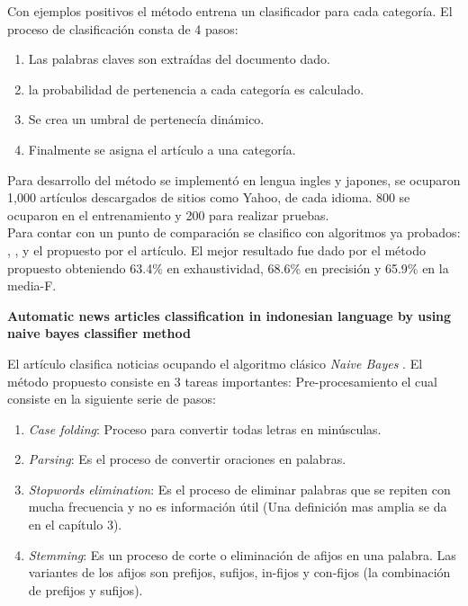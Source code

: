 Con ejemplos positivos el método entrena un clasificador para cada categoría.
El proceso de clasificación consta de 4 pasos:

\begin{enumerate}
	\item Las palabras claves son extraídas del documento dado.
	\item la probabilidad de pertenencia a cada categoría es calculado.
	\item Se crea un umbral de pertenecía dinámico.
	\item Finalmente se asigna el artículo a una categoría.
\end{enumerate}

Para desarrollo del método se implementó en lengua ingles y japones, se ocuparon 1,000 artículos descargados de sitios como Yahoo, de cada idioma. 800 se ocuparon en el entrenamiento y 200 para realizar pruebas. \\

Para contar con un punto de comparación se clasifico con algoritmos  ya probados: , ,  y el propuesto por el artículo. El mejor resultado fue dado por  el método propuesto obteniendo 63.4\% en exhaustividad, 68.6\% en precisión y 65.9\% en la media-F.\\ 



\begin{large}
	 \textbf{Automatic news articles classification in indonesian language by using naive bayes classifier method}
	 \\
\end{large}

El artículo clasifica noticias ocupando el algoritmo clásico \textit{Naive Bayes} \citep{CD7}. El método propuesto consiste en 3 tareas importantes: Pre-procesamiento el cual consiste en la siguiente serie de pasos: 
 
\begin{enumerate}

	\item \textit{Case folding}: Proceso para convertir todas letras en minúsculas.
	\item \textit{Parsing}: Es el proceso de convertir oraciones en palabras.
	\item \textit{Stopwords elimination}: Es el proceso de eliminar palabras que se repiten con mucha frecuencia y no es información útil (Una definición mas amplia se da en el capítulo 3).
	\item \textit{Stemming}: Es un proceso de corte o eliminación de afijos en una palabra. Las variantes de los afijos son prefijos, sufijos, in-fijos y con-fijos (la combinación de prefijos y sufijos).

\end{enumerate}	

